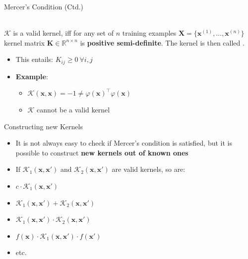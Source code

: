 \begin{frame}{Mercer's Condition (Ctd.)}{}\important
	\begin{boxBlue}
		 \\
		$\mathcal{K}$ is a valid kernel, iff for any set of $n$ training examples $\bm{X} = \{ \bm{x}^{(1)}, \dots, \bm{x}^{(n)} \}$ kernel matrix
		$\bm{K} \in \mathbb{R}^{n \times n}$ is \textbf{positive semi-definite}. The kernel is then called .
	\end{boxBlue}

	\begin{itemize}
		\item This entails: $K_{ij} \ge 0\ \forall i, j$
		\item \textbf{Example}:
		\begin{itemize}
			\item $\mathcal{K}(\bm{x}, \bm{x}) = -1 \ne \varphi(\bm{x})^{\intercal} \varphi(\bm{x})$
			\item $\mathcal{K}$ cannot be a valid kernel
		\end{itemize}
	\end{itemize}
\end{frame}


\begin{frame}{Constructing new Kernels}{}
	\begin{itemize}
		\item It is not always easy to check if Mercer's condition is satisfied, but it is possible to construct
			\textbf{new kernels out of known ones}
		\item If $\mathcal{K}_1(\bm{x}, \bm{x'})$ and $\mathcal{K}_2(\bm{x}, \bm{x'})$ are valid kernels, so are:
	\end{itemize}
	
	\vspace*{2mm}
	\begin{boxBlueNoFrame}
		\begin{itemize}
			\setlength\itemsep{0em}
			\item $c \cdot \mathcal{K}_1(\bm{x}, \bm{x'})$
			\item $\mathcal{K}_1(\bm{x}, \bm{x'}) + \mathcal{K}_2(\bm{x}, \bm{x'})$
			\item $\mathcal{K}_1(\bm{x}, \bm{x'}) \cdot \mathcal{K}_2(\bm{x}, \bm{x'})$
			\item $f(\bm{x}) \cdot \mathcal{K}_1(\bm{x}, \bm{x'}) \cdot f(\bm{x'})$
			\item etc.
		\end{itemize}
	\end{boxBlueNoFrame}
\end{frame}


